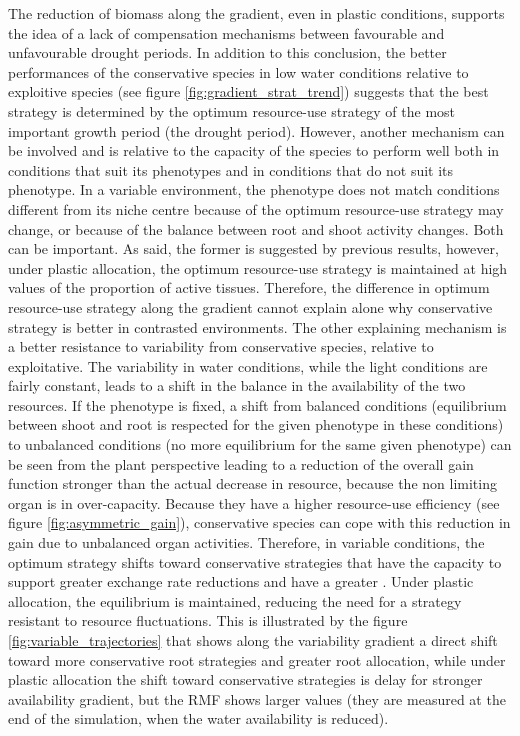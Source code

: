 The reduction of biomass along the gradient, even in plastic conditions, supports the idea of a lack of compensation mechanisms between favourable and unfavourable drought periods. In addition to this conclusion, the better performances of the conservative species in low water conditions relative to exploitive species (see figure \ref{fig:gradient_strat_trend}) suggests that the best strategy is determined by the optimum resource-use strategy of the most important growth period (the drought period). However, another mechanism can be involved and is relative to the capacity of the species to perform well both in conditions that suit its phenotypes and in conditions that do not suit its phenotype. In a variable environment, the phenotype does not match conditions different from its niche centre because of the optimum resource-use strategy may change, or because of the balance between root and shoot activity changes. Both can be important. As said, the former is suggested by previous results, however, under plastic allocation, the optimum resource-use strategy is maintained at high values of the proportion of active tissues. Therefore, the difference in optimum resource-use strategy along the gradient cannot explain alone why conservative strategy is better in contrasted environments. The other explaining mechanism is a better resistance to variability from conservative species, relative to exploitative. The variability in water conditions, while the light conditions are fairly constant, leads to a shift in the balance in the availability of the two resources. If the phenotype is fixed, a shift from balanced conditions (equilibrium between shoot and root is respected for the given phenotype in these conditions) to unbalanced conditions (no more equilibrium for the same given phenotype) can be seen from the plant perspective leading to a reduction of the overall gain function stronger than the actual decrease in resource, because the non limiting organ is in over-capacity. Because they have a higher resource-use efficiency (see figure \ref{fig:asymmetric_gain}), conservative species can cope with this reduction in gain due to unbalanced organ activities. Therefore, in variable conditions, the optimum strategy shifts toward conservative strategies that have the capacity to support greater exchange rate reductions and have a greater . Under plastic allocation, the equilibrium is maintained, reducing the need for a strategy resistant to resource fluctuations. This is illustrated by the figure \ref{fig:variable_trajectories} that shows along the variability gradient a direct shift toward more conservative root strategies and greater root allocation, while under plastic allocation the shift toward conservative strategies is delay for stronger availability gradient, but the RMF shows larger values (they are measured at the end of the simulation, when the water availability is reduced).\\


